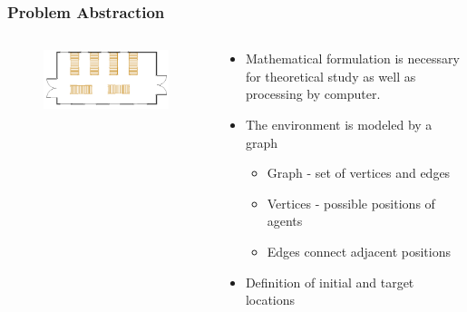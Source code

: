 \documentclass[aspectratio=169,t,xcolor=table]{beamer}
\begin{document}
\begin{frame}
\frametitle{Problem Abstraction}
\begin{columns}
\begin{column}{.4\textwidth}
    \begin{figure}
        \vspace{-20pt}
        \includegraphics[width=1\textwidth]{figs/warehouse-plan-transp.png}
    \end{figure}
    
     \begin{figure}
        \hspace{-10pt}
        \vspace{-30pt}
    \end{figure}
\end{column}
\begin{column}{.6\textwidth}
\begin{itemize}
\item Mathematical formulation is necessary for theoretical study as well as processing by computer.
\item The environment is modeled by a graph
    \begin{itemize}
    \item Graph - set of vertices and edges
    \item Vertices - possible positions of agents
    \item Edges connect adjacent positions
    \end{itemize}
    \item Definition of initial and target locations
\end{itemize}

\end{column}


\end{columns}
\end{frame}
\end{document}
